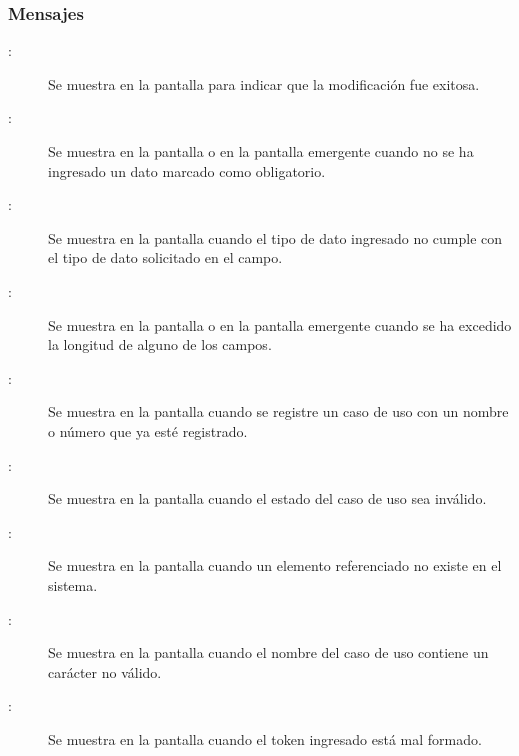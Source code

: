 \subsubsection{Mensajes}

	
\begin{description}
	\item[:] Se muestra en la pantalla  para indicar que la modificación fue exitosa.
	\item[:] Se muestra en la pantalla  o en la pantalla emergente  cuando no se ha ingresado un dato marcado como obligatorio.
	\item[:] Se muestra en la pantalla  cuando el tipo de dato ingresado no cumple con el tipo de dato solicitado en el campo.
	\item[:] Se muestra en la pantalla  o en la pantalla emergente  cuando se ha excedido la longitud de alguno de los campos.
	\item[:] Se muestra en la pantalla  cuando se registre un caso de uso con un nombre o número que ya esté registrado.
	\item[:] Se muestra en la pantalla  cuando el estado del caso de uso sea inválido.
	\item[:] Se muestra en la pantalla  cuando un elemento referenciado no existe en el sistema.
	\item[:] Se muestra en la pantalla  cuando el nombre del caso de uso contiene un carácter no válido.
	\item[:] Se muestra en la pantalla  cuando el token ingresado está mal formado.
\end{description}
